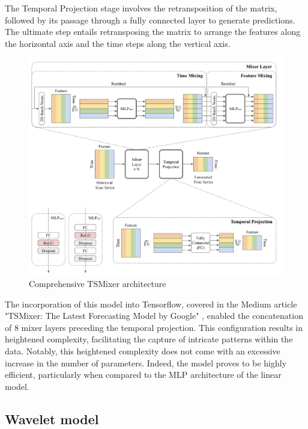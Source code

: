 The Temporal Projection stage involves the retransposition of the matrix, followed by its passage through a fully connected layer to generate predictions. The ultimate step entails retransposing the matrix to arrange the features along the horizontal axis and the time steps along the vertical axis.

\begin{figure}
    \centering
    \includegraphics[width=1\linewidth]{images/model architectures/tsmixermodel.png}
    \caption{Comprehensive TSMixer architecture \cite{chen2023tsmixer}}
    \label{fig:tsmixer-whole architecture}
\end{figure}

The incorporation of this model into Tensorflow, covered in the Medium article "TSMixer: The Latest Forecasting Model by Google" \cite{peixeiro2023tsmixer}, enabled the concatenation of 8 mixer layers preceding the temporal projection. This configuration results in heightened complexity, facilitating the capture of intricate patterns within the data. Notably, this heightened complexity does not come with an excessive increase in the number of parameters. Indeed, the model proves to be highly efficient, particularly when compared to the MLP architecture of the linear model.

\subsection{Wavelet model}

